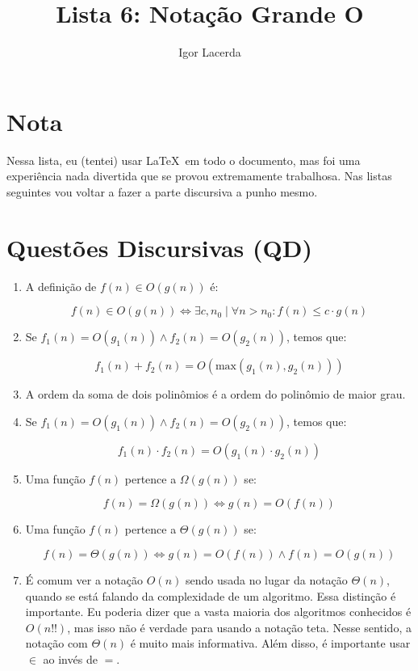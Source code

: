 \documentclass{article}
\title{Lista 6: Notação Grande O}
\author{Igor Lacerda}
\begin{document}
\maketitle

\section*{Nota}

Nessa lista, eu (tentei) usar \LaTeX\ em todo o documento, mas foi uma experiência nada divertida que se provou extremamente trabalhosa. Nas listas seguintes vou voltar a fazer a parte discursiva a punho mesmo.

\section*{Questões Discursivas (QD)}

\begin{enumerate}

	\item A definição de \( f(n) \in O(g(n)) \) é:

	      \[ f(n) \in O(g(n)) \iff \exists c, n_0 \mid \forall n > n_0 : f(n) \leq c \cdot g(n) \]

	\item Se \( f_1(n) = O(g_1(n)) \land f_2(n) = O(g_2(n))  \), temos que:

	      \[ f_1(n) + f_2(n) = O(\textrm{max}(g_1(n), g_2(n)) )  \]

	\item A ordem da soma de dois polinômios é a ordem do polinômio de maior grau.

	\item Se \( f_1(n) = O(g_1(n)) \land f_2(n) = O(g_2(n))  \), temos que:

	      \[ f_1(n) \cdot f_2(n) = O(g_1(n) \cdot g_2(n)) \]

	\item Uma função \( f(n) \) pertence a \( \Omega(g(n)) \) se:

	      \[ f(n) = \Omega(g(n)) \iff g(n) = O(f(n)) \]

	\item Uma função \( f(n) \) pertence a \( \Theta(g(n)) \) se:

	      \[ f(n) = \Theta(g(n)) \iff g(n) = O(f(n)) \land f(n) = O(g(n))\]

	\item É comum ver a notação \( O(n) \) sendo usada no lugar da notação \( \Theta(n) \), quando se está falando da complexidade de um algoritmo. Essa distinção é importante. Eu poderia dizer que a vasta maioria dos algoritmos conhecidos é \( O(n!!) \), mas isso não é verdade para usando a notação teta. Nesse sentido, a notação com \( \Theta(n) \) é muito mais informativa. Além disso, é importante usar \( \in \) ao invés de \( = \).

\end{enumerate}
\end{document}
